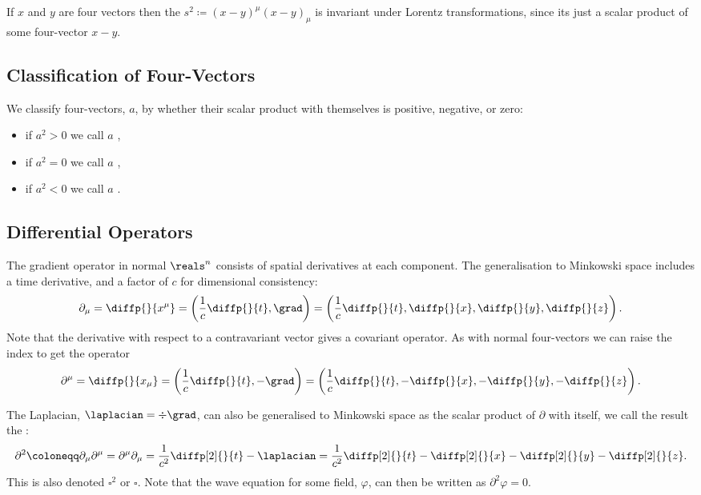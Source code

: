 \documentclass[fleqn]{NotesClass}
\newcommand{\dalembertian}{\partial^2}
\begin{document}
\begin{appendices}
        If \(x\) and \(y\) are four vectors then the  \(s^2 \coloneqq (x - y)^\mu(x - y)_\mu\) is invariant under Lorentz transformations, since its just a scalar product of some four-vector \(x - y\).
        
        \subsection{Classification of Four-Vectors}
        We classify four-vectors, \(a\), by whether their scalar product with themselves is positive, negative, or zero:
        \begin{itemize}
            \item if \(a^2 > 0\) we call \(a\) ,
            \item if \(a^2 = 0\) we call \(a\) ,
            \item if \(a^2 < 0\) we call \(a\) .
        \end{itemize}
        
        \subsection{Differential Operators}
        The gradient operator in normal \(\reals^n\) consists of spatial derivatives at each component.
        The generalisation to Minkowski space includes a time derivative, and a factor of \(c\) for dimensional consistency:\index{\(\partial_\mu\)}
        \begin{equation}
            \partial_\mu = \diffp{}{x^\mu} = \left( \frac{1}{c}\diffp{}{t}, \grad \right) = \left( \frac{1}{c}\diffp{}{t}, \diffp{}{x}, \diffp{}{y}, \diffp{}{z} \right).
        \end{equation}
        Note that the derivative with respect to a contravariant vector gives a covariant operator.
        As with normal four-vectors we can raise the index to get the operator
        \begin{equation}
            \partial^\mu = \diffp{}{x_\mu} = \left( \frac{1}{c}\diffp{}{t}, -\grad \right) = \left( \frac{1}{c}\diffp{}{t}, -\diffp{}{x}, -\diffp{}{y}, -\diffp{}{z} \right).
        \end{equation}
        
        The Laplacian, \(\laplacian = \div \grad\), can also be generalised to Minkowski space as the scalar product of \(\partial\) with itself, we call the result the :
        \begin{equation}
            \dalembertian \coloneqq \partial_\mu \partial^\mu = \partial^\mu \partial_\mu = \frac{1}{c^2}\diffp[2]{}{t} - \laplacian = \frac{1}{c^2} \diffp[2]{}{t} - \diffp[2]{}{x} - \diffp[2]{}{y} - \diffp[2]{}{z}.
        \end{equation}
        This is also denoted \(\square^2\) or \(\square\).
        Note that the wave equation for some field, \(\varphi\), can then be written as \(\dalembertian\varphi = 0\).
        

\end{appendices}
\end{document}
